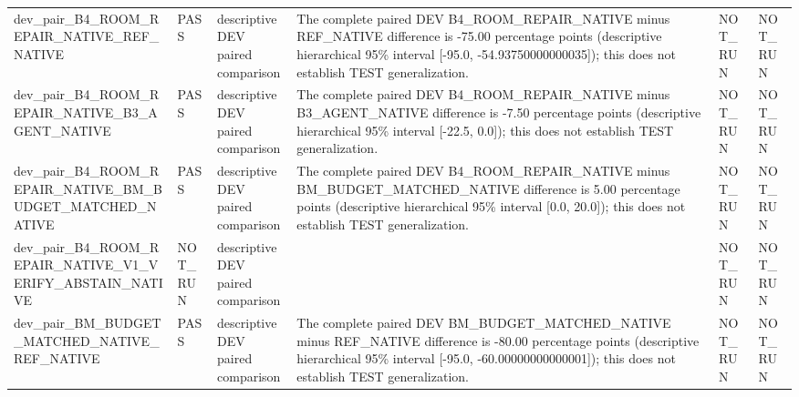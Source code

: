 \begin{tabular}{llllll}
dev\_pair\_B4\_ROOM\_REPAIR\_NATIVE\_REF\_NATIVE & PASS & descriptive DEV paired comparison & The complete paired DEV B4\_ROOM\_REPAIR\_NATIVE minus REF\_NATIVE difference is -75.00 percentage points (descriptive hierarchical 95\% interval [-95.0, -54.93750000000035]); this does not establish TEST generalization. & NOT\_RUN & NOT\_RUN \\
dev\_pair\_B4\_ROOM\_REPAIR\_NATIVE\_B3\_AGENT\_NATIVE & PASS & descriptive DEV paired comparison & The complete paired DEV B4\_ROOM\_REPAIR\_NATIVE minus B3\_AGENT\_NATIVE difference is -7.50 percentage points (descriptive hierarchical 95\% interval [-22.5, 0.0]); this does not establish TEST generalization. & NOT\_RUN & NOT\_RUN \\
dev\_pair\_B4\_ROOM\_REPAIR\_NATIVE\_BM\_BUDGET\_MATCHED\_NATIVE & PASS & descriptive DEV paired comparison & The complete paired DEV B4\_ROOM\_REPAIR\_NATIVE minus BM\_BUDGET\_MATCHED\_NATIVE difference is 5.00 percentage points (descriptive hierarchical 95\% interval [0.0, 20.0]); this does not establish TEST generalization. & NOT\_RUN & NOT\_RUN \\
dev\_pair\_B4\_ROOM\_REPAIR\_NATIVE\_V1\_VERIFY\_ABSTAIN\_NATIVE & NOT\_RUN & descriptive DEV paired comparison &  & NOT\_RUN & NOT\_RUN \\
dev\_pair\_BM\_BUDGET\_MATCHED\_NATIVE\_REF\_NATIVE & PASS & descriptive DEV paired comparison & The complete paired DEV BM\_BUDGET\_MATCHED\_NATIVE minus REF\_NATIVE difference is -80.00 percentage points (descriptive hierarchical 95\% interval [-95.0, -60.00000000000001]); this does not establish TEST generalization. & NOT\_RUN & NOT\_RUN \\
\end{tabular}
